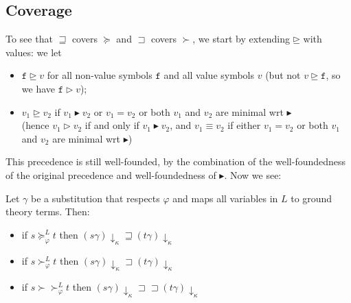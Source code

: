 \documentclass[a4paper,USenglish,cleveref,autoref,thm-restate]{lipics-v2021}
\newcommand{\gtvA}{L}
\newcommand{\downarrowcalc}{\downarrow_\kappa}
\newcommand{\grmain}{\sqsupset}
\newcommand{\geqmain}{\sqsupseteq}
\newcommand{\rpomain}{\sqsupset\!\!\sqsupset}
\newcommand{\geqth}{\succeq_\varphi^\gtvA}
\newcommand{\grth}{\succ_\varphi^\gtvA}
\newcommand{\rpoth}{\succ\!\!\!\succ_\varphi^\gtvA}
\newcommand{\grpred}{\rhd}
\newcommand{\geqpred}{\unrhd}
\newcommand{\eqpred}{\equiv}
\newcommand{\grsort}{\blacktriangleright}
\newcommand{\symb}[1]{\mathtt{#1}}
\newcommand{\afun}{\symb{f}}
\begin{document}
\subsection{Coverage}

To see that $\geqmain$ covers $\succeq$ and $\grmain$ covers $\succ$, we start by extending
$\geqpred$ with values: we let
\begin{itemize}
\item $\afun \geqpred v$ for all non-value symbols $\afun$ and all value symbols $v$
  (but not $v \geqpred \afun$, so we have $\afun \grpred v$);
\item $v_1 \geqpred v_2$ if $v_1 \grsort v_2$ or $v_1 = v_2$ or both $v_1$ and $v_2$ are minimal
  wrt $\grsort$ \\
  (hence $v_1 \grpred v_2$ if and only if $v_1 \grsort v_2$, and $v_1 \eqpred v_2$ if either
  $v_1 = v_2$ or both $v_1$ and $v_2$ are minimal wrt $\grsort$)
\end{itemize}
This precedence is still well-founded, by the combination of the well-foundedness of the original
precedence and well-foundedness of $\grsort$.  Now we see:

\begin{lemma}
Let $\gamma$ be a substitution that respects $\varphi$ and maps all variables in $\gtvA$ to ground
theory terms.  Then:
\begin{itemize}
\item if $s \geqth t$ then $(s\gamma)\downarrowcalc \geqmain (t\gamma)\downarrowcalc$
\item if $s \grth t$ then $(s\gamma)\downarrowcalc \grmain (t\gamma)\downarrowcalc$
\item if $s \rpoth t$ then $(s\gamma)\downarrowcalc \rpomain (t\gamma)\downarrowcalc$
\end{itemize}
\end{lemma}
\end{document}
